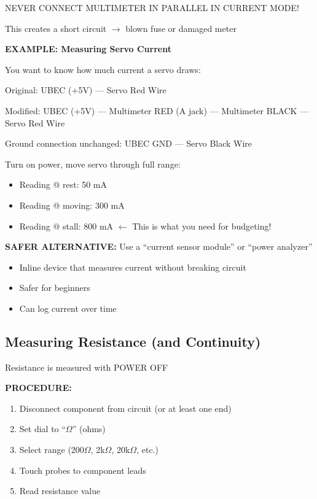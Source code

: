 \documentclass[11pt,letterpaper]{article}
\begin{document}
\begin{warningbox}
NEVER CONNECT MULTIMETER IN PARALLEL IN CURRENT MODE!

This creates a short circuit $\rightarrow$ blown fuse or damaged meter
\end{warningbox}

\begin{examplebox}
\textbf{EXAMPLE: Measuring Servo Current}

You want to know how much current a servo draws:

Original: UBEC (+5V) --- Servo Red Wire

Modified: UBEC (+5V) --- Multimeter RED (A jack) --- Multimeter BLACK --- Servo Red Wire

Ground connection unchanged: UBEC GND --- Servo Black Wire

Turn on power, move servo through full range:
\begin{itemize}[nosep]
\item Reading @ rest: 50 mA
\item Reading @ moving: 300 mA
\item Reading @ stall: 800 mA $\leftarrow$ This is what you need for budgeting!
\end{itemize}
\end{examplebox}

\textbf{SAFER ALTERNATIVE:} Use a ``current sensor module'' or ``power analyzer''
\begin{itemize}
\item Inline device that measures current without breaking circuit
\item Safer for beginners
\item Can log current over time
\end{itemize}

\subsection{Measuring Resistance (and Continuity)}

Resistance is measured with POWER OFF

\textbf{PROCEDURE:}
\begin{enumerate}
\item Disconnect component from circuit (or at least one end)
\item Set dial to ``$\Omega$'' (ohms)
\item Select range (200$\Omega$, 2k$\Omega$, 20k$\Omega$, etc.)
\item Touch probes to component leads
\item Read resistance value
\end{enumerate}
\end{document}

